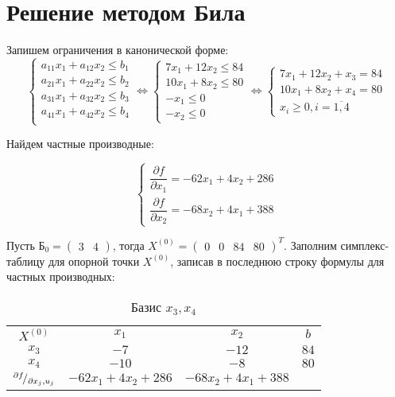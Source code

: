 \section{Решение методом Била}

Запишем ограничения в канонической форме:
\begin{equation*}
\begin{cases}
	a_{11} x_1 + a_{12} x_2 \leq b_1 \\
	a_{21} x_1 + a_{22} x_2 \leq b_2 \\
	a_{31} x_1 + a_{32} x_2 \leq b_3 \\
	a_{41} x_1 + a_{42} x_2 \leq b_4 \\
\end{cases}
\Longleftrightarrow
\begin{cases}
	7 x_1 + 12 x_2 \leq 84 \\
	10 x_1 + 8 x_2 \leq 80 \\
	-x_1 \leq 0 \\
	-x_2 \leq 0
\end{cases}
\Longleftrightarrow
\begin{cases}
	7 x_1 + 12 x_2 + x_3 = 84 \\
	10 x_1 + 8 x_2 + x_4 = 80 \\
	x_i \geq 0, i = \overline{1,4}
\end{cases}
\end{equation*}

Найдем частные производные:

\begin{equation*}
	\begin{cases}
	\dfrac{\partial f}{\partial x_1} = -62 x_1 + 4 x_2 + 286 \\[0.3cm]
	\dfrac{\partial f}{\partial x_2} = -68 x_2 + 4 x_1 + 388
	\end{cases}
\end{equation*}

Пусть $\text{Б}_0 = \begin{pmatrix} 3 & 4 \end{pmatrix}$, тогда $X^{(0)} = \begin{pmatrix} 0 & 0 & 84 & 80 \end{pmatrix}^T$. Заполним симплекс-таблицу для опорной точки $X^{(0)}$, записав в последнюю строку формулы для частных производных:

\begin{table}[H]
\begin{center}
	\def\tabcolsep{15pt}
	\def\arraystretch{1.3}
	\caption{Базис $x_3, x_4$}
	\begin{tabular}{|c||c|c||c|}
		\hline
		$X^{(0)}$ & $x_1$ & $x_2$ & $b$ \\ 
		\hhline{|=#==#=|}
		$x_3$ & $-7$ & $-12$ & $84$ \\ 
		\hline
		$x_4$ & $-10$ & $-8$ & $80$ \\ 
		\hhline{|=#==#=|}
		${}^{\partial f}\!/_{\partial x_j, u_j}$ & $-62 x_1 + 4 x_2 + 286$ & $-68 x_2 + 4 x_1 + 388$ &  \\ 
		\hline
	\end{tabular}
\end{center}
\end{table}

